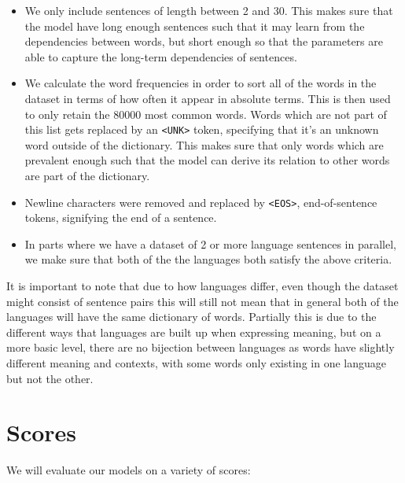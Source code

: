\begin{itemize}
\item We only include sentences of length between 2 and 30. This makes sure that
  the model have long enough sentences such that it may learn from the
  dependencies between words, but short enough so that the parameters are able
  to capture the long-term dependencies of sentences.
\item We calculate the word frequencies in order to sort all of the words in the
  dataset in terms of how often it appear in absolute terms. This is then used
  to only retain the 80000 most common words. Words which are not part of this
  list gets replaced by an \texttt{<UNK>} token, specifying that it's an unknown
  word outside of the dictionary. This makes sure that only words which are
  prevalent enough such that the model can derive its relation to other words
  are part of the dictionary.
\item Newline characters were removed and replaced by \texttt{<EOS>},
  end-of-sentence tokens, signifying the end of a sentence.
\item In parts where we have a dataset of 2 or more language sentences in
  parallel, we make sure that both of the the languages both satisfy the above criteria.
\end{itemize}

It is important to note that due to how languages differ, even though the
dataset might consist of sentence pairs this will still not mean that in general
both of the languages will have the same dictionary of words. Partially this is
due to the different ways that languages are built up when expressing meaning,
but on a more basic level, there are no bijection between languages as words
have slightly different meaning and contexts, with some words only existing in
one language but not the other.

\section{Scores}

We will evaluate our models on a variety of scores:

